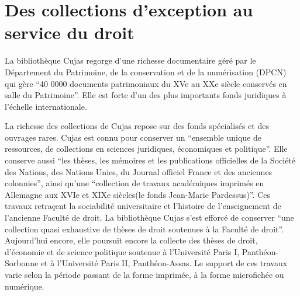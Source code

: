 \section{Des collections d'exception au service du droit}

La bibliothèque Cujas regorge d'une richesse documentaire géré par le Département du Patrimoine, de la conservation et de la numérisation (DPCN) qui gère \enquote{40 0000 documents patrimoniaux du XVe au XXe siècle conservés en salle du Patrimoine}. Elle est forte d'un des plus importants fonds juridiques à l'échelle internationale.

La richesse des collections de Cujas repose sur des fonds spécialisés et des ouvrages rares. Cujas est connu pour conserver un \enquote{ensemble unique de ressources, de collections en sciences juridiques, économiques et politique}. Elle conserve aussi \enquote{les thèses, les mémoires et les publications officielles de la Société des Nations, des Nations Unies, du Journal officiel France et des anciennes colonnies}, ainsi qu'une \enquote{collection de travaux académiques imprimés en Allemagne aux XVIe et XIXe siècles(le fonds Jean-Marie Pardessus)}. Ces travaux retraçent la sociabilité universitaire et l'histoire de l'enseignement de l'ancienne Faculté de droit. La bibliothèque Cujas s'est efforcé de conserver \enquote{une collection quasi exhaustive de thèses de droit soutenues à la Faculté de droit}. Aujourd'hui encore, elle poursuit encore la collecte des thèses de droit, d'économie et de science politique soutenue à l'Université Paris I, Panthéon-Sorbonne et à l'Université Paris II, Panthéon-Assas. Le support de ces travaux varie selon la période passant de la forme imprimée, à la forme microfichée ou numérique.

